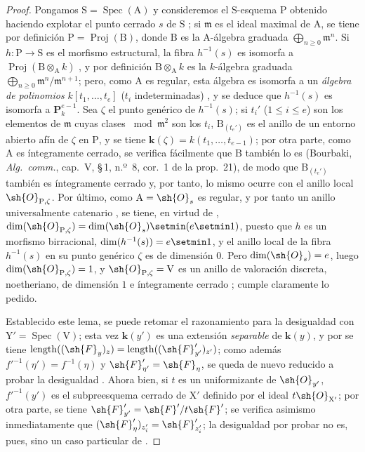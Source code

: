 \begin{proof}
Pongamos $\mathrm{S}=\operatorname{Spec}(\mathrm{A})$ y consideremos el $\mathrm{S}$-esquema $\mathrm{P}$ obtenido haciendo explotar el punto cerrado $s$ de $\mathrm{S}$ ; si $\mathfrak{m}$ es el ideal maximal de $\mathrm{A}$, se tiene por definición $\mathrm{P}=\operatorname{Proj}(\mathrm{B})$, donde $\mathrm{B}$ es la $\mathrm{A}$-álgebra graduada $\bigoplus_{n\geqslant 0}\mathfrak{m}^n$.
Si $h:\mathrm{P}\to\mathrm{S}$ es el morfismo estructural, la fibra $h^{-1}(s)$ es isomorfa a $\operatorname{Proj}(\mathrm{B}\otimes_\mathrm{A} k)$ , y por definición $\mathrm{B}\otimes_\mathrm{A} k$ es la $k$-álgebra graduada $\bigoplus_{n\geqslant 0}\mathfrak{m}^n/\mathfrak{m}^{n+1}$; pero, como $\mathrm{A}$ es regular, esta álgebra es isomorfa a un \emph{álgebra de polinomios} $k[t_1,\ldots,t_e]$ ($t_i$ indeterminadas) , y se deduce que $h^{-1}(s)$ es isomorfa a $\mathbf{P}_k^{e-1}$.
Sea $\zeta$ el punto genérico de $h^{-1}(s)$; si $t_i'$ ($1\leqslant i\leqslant e$) son los elementos de $\mathfrak{m}$ cuyas clases $\bmod\mathfrak{m}^2$ son los $t_i$, $\mathrm{B}_{(t_e')}$ es el anillo de un entorno abierto afín de $\zeta$ en $\mathrm{P}$, y se tiene $\boldsymbol{k}(\zeta)=k(t_1,\ldots,t_{e-1})$; por otra parte, como $\mathrm{A}$ es íntegramente cerrado, se verifica fácilmente que $\mathrm{B}$ también lo es (Bourbaki, \emph{Alg.\ comm.}, cap.~V, \S\,1, n.º~8, cor.~1 de la prop.~21), de modo que $\mathrm{B}_{(t_e')}$ también es íntegramente cerrado y, por tanto, lo mismo ocurre con el anillo local $\sh{O}_{\mathrm{P},\zeta}$.
Por último, como $\mathrm{A}=\sh{O}_s$ es regular, y por tanto un anillo universalmente catenario , se tiene, en virtud de , $\dim(\sh{O}_{\mathrm{P},\zeta})=\dim(\sh{O}_s)\setmin(e\setmin 1)$, puesto que $h$ es un morfismo birracional, $\dim(h^{-1}(s))=e\setmin 1$, y el anillo local de la fibra $h^{-1}(s)$ en su punto genérico $\zeta$ es de dimensión $0$.
Pero $\dim(\sh{O}_s)=e$, luego $\dim(\sh{O}_{\mathrm{P},\zeta})=1$, y $\sh{O}_{\mathrm{P},\zeta}=\mathrm{V}$ es un anillo de valoración discreta, noetheriano, de dimensión $1$ e íntegramente cerrado ; cumple claramente lo pedido.

Establecido este lema, se puede retomar el razonamiento para la desigualdad  con $\mathrm{Y}'=\operatorname{Spec}(\mathrm{V})$; esta vez $\boldsymbol{k}(y')$ es una extensión \emph{separable} de $\boldsymbol{k}(y)$, y por  se tiene $\operatorname{length}((\sh{F}_y)_z)=\operatorname{length}((\sh{F}_{y'}')_{z'})$; como además $f'^{-1}(\eta')=f^{-1}(\eta)$ y $\sh{F}_{\eta'}'=\sh{F}_\eta$, se queda de nuevo reducido a probar la desigualdad .
Ahora bien, si $t$ es un uniformizante de $\sh{O}_{y'}$, $f'^{-1}(y')$ es el subpreesquema cerrado de $\mathrm{X}'$ definido por el ideal $t\sh{O}_{\mathrm{X}'}$; por otra parte, se tiene $\sh{F}_{y'}'=\sh{F}'/t\sh{F}'$; se verifica asimismo inmediatamente  que $(\sh{F}_\eta')_{z_i'}=\sh{F}_{z_i'}'$; la desigualdad por probar  no es, pues, sino un caso particular de .
\end{proof}

